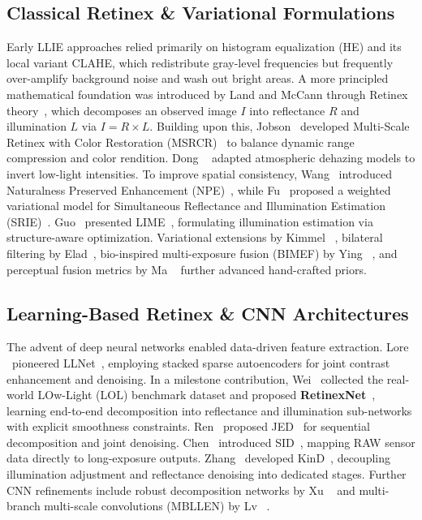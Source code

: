 \documentclass[conference]{IEEEtran}
\begin{document}
\subsection{Classical Retinex \& Variational Formulations}
Early LLIE approaches relied primarily on histogram equalization (HE) and its local variant CLAHE, which redistribute gray-level frequencies but frequently over-amplify background noise and wash out bright areas. A more principled mathematical foundation was introduced by Land and McCann through Retinex theory~\cite{land1971retinex}, which decomposes an observed image $I$ into reflectance $R$ and illumination $L$ via $I = R \times L$. Building upon this, Jobson \etal~developed Multi-Scale Retinex with Color Restoration (MSRCR)~\cite{jobson1997multiscale} to balance dynamic range compression and color rendition. Dong \etal~\cite{dong2011fast} adapted atmospheric dehazing models to invert low-light intensities. To improve spatial consistency, Wang \etal~introduced Naturalness Preserved Enhancement (NPE)~\cite{wang2013naturalness}, while Fu \etal~proposed a weighted variational model for Simultaneous Reflectance and Illumination Estimation (SRIE)~\cite{fu2016weighted}. Guo \etal~presented LIME~\cite{guo2016lime}, formulating illumination estimation via structure-aware optimization. Variational extensions by Kimmel \etal~\cite{kimmel2003variational}, bilateral filtering by Elad~\cite{elad2005retinex}, bio-inspired multi-exposure fusion (BIMEF) by Ying \etal~\cite{ying2017bio}, and perceptual fusion metrics by Ma \etal~\cite{ma2015perceptual} further advanced hand-crafted priors.

\subsection{Learning-Based Retinex \& CNN Architectures}
The advent of deep neural networks enabled data-driven feature extraction. Lore \etal~pioneered LLNet~\cite{lore2017llnet}, employing stacked sparse autoencoders for joint contrast enhancement and denoising. In a milestone contribution, Wei \etal~collected the real-world LOw-Light (LOL) benchmark dataset and proposed \textbf{RetinexNet}~\cite{wei2018retinexnet}, learning end-to-end decomposition into reflectance and illumination sub-networks with explicit smoothness constraints. Ren \etal~proposed JED~\cite{ren2018joint} for sequential decomposition and joint denoising. Chen \etal~introduced SID~\cite{chen2018learning}, mapping RAW sensor data directly to long-exposure outputs. Zhang \etal~developed KinD~\cite{zhang2019kind}, decoupling illumination adjustment and reflectance denoising into dedicated stages. Further CNN refinements include robust decomposition networks by Xu \etal~\cite{xu2018structure} and multi-branch multi-scale convolutions (MBLLEN) by Lv \etal~\cite{lv2018mbllen}.
\end{document}

